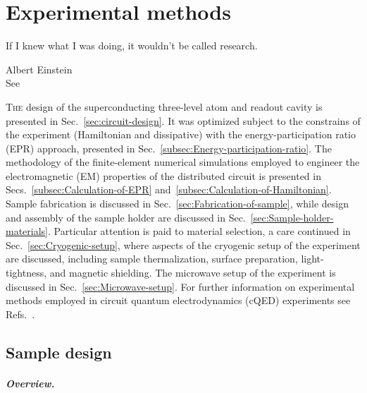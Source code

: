 
\chapter{Experimental methods\label{chap:Experimental-Methods} }

  
\singlespacing
\epigraph{ 
If I knew what I was doing, it wouldn't be called research.}    
{Albert Einstein\\
See \citet{hawken2010natural}}   
\doublespacing\noindent  \noindent\lettrine{T}{he} design of the superconducting three-level
atom and readout cavity is presented in Sec.~\ref{sec:circuit-design}.
It was optimized subject to the constrains of the experiment (Hamiltonian
and dissipative) with the energy-participation ratio (EPR) approach,
presented in Sec.~\ref{subsec:Energy-participation-ratio}. The methodology
of the finite-element numerical simulations employed to engineer the
electromagnetic (EM) properties of the distributed circuit is presented
in Secs.~\ref{subsec:Calculation-of-EPR} and~\ref{subsec:Calculation-of-Hamiltonian}.
Sample fabrication is discussed in Sec.~\ref{sec:Fabrication-of-sample},
while design and assembly of the sample holder are discussed in Sec.~\ref{sec:Sample-holder-materials}.
Particular attention is paid to material selection, a care continued
in Sec.~\ref{sec:Cryogenic-setup}, where aspects of the cryogenic
setup of the experiment are discussed, including sample thermalization,
surface preparation, light-tightness, and magnetic shielding. The
microwave setup of the experiment is discussed in Sec.~\ref{sec:Microwave-setup}.
For further information on experimental methods employed in circuit
quantum electrodynamics (cQED) experiments see Refs.~\citet{Geerlings2013,Reed2013,Reagor2016,Brecht2017-Thesis}.

\section{Sample design \label{sec:circuit-design}}

\paragraph{Overview. }

